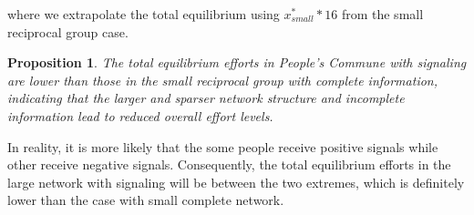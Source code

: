 \documentclass[12pt]{article}
\newtheorem{proposition}{Proposition}
\begin{document}
  where we extrapolate the total equilibrium using $x^*_{small} * 16$ from the small reciprocal group case.\\ 
\begin{proposition}
  The total equilibrium efforts in People's Commune with signaling are lower than those in the small reciprocal group with complete information, indicating that the larger and sparser network structure and incomplete information lead to reduced overall effort levels.
\end{proposition}
In reality, it is more likely that the some people receive positive signals while other receive negative signals. Consequently, the total equilibrium efforts in the large network with signaling will be between the two extremes, which is definitely lower than the case with small complete network.\\
\end{document}
